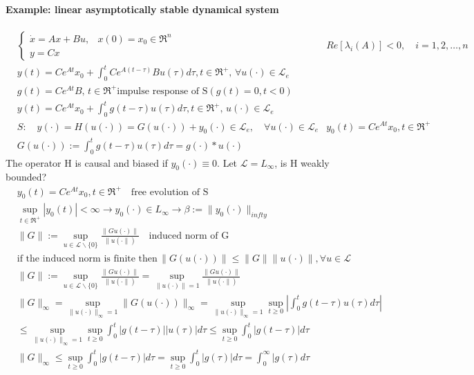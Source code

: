 \paragraph{Example: linear asymptotically stable dynamical system}
\[
\begin{aligned}
	&\begin{cases}
		\dot{x}=Ax+Bu, &x(0)=x_0 \in \Re^n\\
		y=Cx
	\end{cases}
&Re[\lambda_i(A)]<0,\quad i=1,2,\dots,n\\
&y(t)=Ce^{At}x_0+\int_{0}^{t}Ce^{A(t-\tau)}Bu(\tau)d\tau,t\in\Re^+,\, \forall u(\cdot)\in\mathcal{L}_e\\
&g(t)=Ce^{At}B,\, t\in\Re^+ \text{impulse response of S} (g(t)=0, t<0)\\
&y(t)=Ce^{At}x_0+\int_{0}^{t}g(t-\tau)u(\tau)d\tau, t \in\Re^+, \, u(\cdot)\in \mathcal{L}_e\\
&S:\quad y(\cdot)=H(u(\cdot))=G(u(\cdot))+y_0(\cdot)\in\mathcal{L}_e,\quad \forall u(\cdot) \in \mathcal{L}_e
&y_0(t)=Ce^{At}x_0, t\in \Re^+\\
&G(u(\cdot)):=\int_{0}^{t}g(t-\tau)u(\tau)d\tau=g(\cdot)*u(\cdot)	
\end{aligned}
\] The operator H is causal and biased if $y_0(\cdot)\equiv 0$. Let $\boxed{\mathcal{L}=L_{\infty}}$, is H weakly bounded?\[
\begin{aligned}
	&y_0(t)=Ce^{At}x_0, t \in \Re^+ \quad \text{free evolution of S}\\
	&\sup_{t\in\Re^+} |y_0(t)|<\infty \to y_0(\cdot) \in L_{\infty} \to \beta := \|y_0(\cdot)\|_{infty}\\
	&\|G\|:=\sup_{u\in\mathcal{L}\smallsetminus\{0\}}\frac{\|Gu(\cdot)\|}{\|u(\cdot\|)}\quad \text{induced norm of G}\\
	&\text{if the induced norm is finite then} 	\, \|G(u(\cdot))\|\le\|G\|\|u(\cdot)\|,\forall u \in \mathcal{L}\\
	&\|G\|:=\sup_{u\in\mathcal{L}\smallsetminus\{0\}}\frac{\|Gu(\cdot)\|}{\|u(\cdot\|)}=\sup_{\|u(\cdot)\|=1}\frac{\|Gu(\cdot)\|}{\|u(\cdot\|)}\\
	&\|G\|_{\infty}=\sup_{\|u(\cdot)\|_{\infty}=1}\|G(u(\cdot))\|_{\infty}=\sup_{\|u(\cdot)\|_{\infty}=1}\sup_{t\ge0} \left | \int_{0}^{t}g(t-\tau)u(\tau)d\tau \right |\\
	&\le\sup_{\|u(\cdot)\|_{\infty}=1}\sup_{t\ge0}\int_{0}^{t}|g(t-\tau)||u(\tau)|d\tau\le\sup_{t\ge0}\int_{0}^{t}|g(t-\tau)|d\tau \\
	&\|G\|_{\infty} \le\sup_{t\ge0}\int_{0}^{t}|g(t-\tau)|d\tau = \sup_{t\ge0}\int_{0}^{t}|g(\tau)|d\tau=\int_{0}^{\infty}|g(\tau)d\tau \\

\end{aligned}\]
